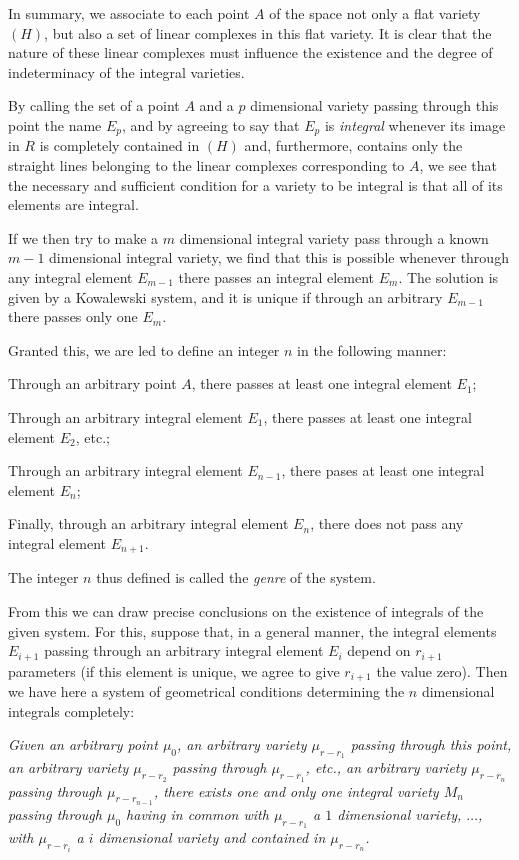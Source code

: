 \documentclass[leqno,11pt]{book}
\theoremstyle{shape1}
\theoremstyle{shapesmall}
\begin{document}
In summary, we associate to each point $A$ of the space not only a flat variety $(H)$, but also a set of linear complexes in this flat variety. It is clear that the nature of these linear complexes must influence the existence and the degree of indeterminacy of the integral varieties.

By calling the set of a point $A$ and a $p$ dimensional variety passing through this point the name $E_{p}$, and by agreeing to say that $E_{p}$ is \emph{integral} whenever its image in $R$ is completely contained in $(H)$ and, furthermore, contains only the straight lines belonging to the linear complexes corresponding to $A$, we see that the necessary and sufficient condition for a variety to be integral is that all of its elements are integral.

If we then try to make a $m$ dimensional integral variety pass through a known $m-1$ dimensional integral variety, we find that this is possible whenever through any integral element $E_{m-1}$ there passes an integral element $E_{m}$. The solution is given by a Kowalewski system, and it is unique if through an arbitrary $E_{m-1}$ there passes only one $E_{m}$.

Granted this, we are led to define an integer $n$ in the following manner:

Through an arbitrary point $A$, there passes at least one integral element $E_{1}$;

Through an arbitrary integral element $E_{1}$, there passes at least one integral element $E_{2}$, etc.;

Through an arbitrary integral element $E_{n-1}$, there pases at least one integral element $E_{n}$;

Finally, through an arbitrary integral element $E_{n}$, there does not pass any integral element $E_{n+1}$.

The integer $n$ thus defined is called the \emph{genre} of the system.

From this we can draw precise conclusions on the existence of integrals of the given system. For this, suppose that, in a general manner, the integral elements $E_{i+1}$ passing through an arbitrary integral element $E_{i}$ depend on $r_{i+1}$ parameters (if this element is unique, we agree to give $r_{i+1}$ the value zero). Then we have here a system of geometrical conditions determining the $n$ dimensional integrals completely:

\emph{Given an arbitrary point $\mu_{0}$, an arbitrary variety $\mu_{r-r_{1}}$ passing through this point, an arbitrary variety $\mu_{r-r_{2}}$ passing through $\mu_{r-r_{1}}$, etc., an arbitrary variety $\mu_{r-r_{n}}$ passing through $\mu_{r-r_{n-1}}$, there exists one and only one integral variety $M_{n}$ passing through $\mu_{0}$ having in common with $\mu_{r-r_{1}}$ a $1$ dimensional variety, $\dots$, with $\mu_{r-r_{i}}$ a $i$ dimensional variety and contained in $\mu_{r-r_{n}}$.}
\end{document}
